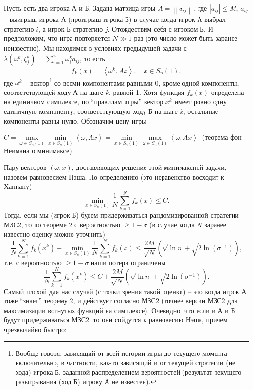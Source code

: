 \begin{problem}

Пусть есть два игрока А и Б. Задана матрица игры $A=\left\| {a_{ij} } \right\|$, где $\left| 
{a_{ij} } \right|\le M$, $a_{ij} $ -- выигрыш игрока А (проигрыш игрока Б) в 
случае когда игрок А выбрал стратегию $i$, а игрок Б стратегию $j$. 
Отождествим себя с игроком Б. И предположим, что игра повторяется $N\gg 1$ 
раз (это число может быть заранее неизвестно). Мы находимся в условиях 
предыдущей задачи с $\lambda \left( {\omega ^k,\zeta _j^k } 
\right)=\sum\limits_{i=1}^n {\omega _i^k a_{ij} } $, то есть
\[
f_k \left( x \right)=\left\langle {\omega ^k,Ax} \right\rangle ,
\quad
x\in S_n \left( 1 \right),
\]
где $\omega ^k$ -- вектор\footnote{ Вообще говоря, зависящий от всей истории 
игры до текущего момента включительно, в частности, как-то зависящий и от 
текущей стратегии (не хода) игрока Б, заданной распределением вероятностей 
(результат текущего разыгрывания (ход Б) игроку А не известен).} со всеми 
компонентами равными 0, кроме одной компоненты, соответствующей ходу А на 
шаге $k$, равной 1. Хотя функция $f_k \left( x \right)$ определена на 
единичном симплексе, по ``правилам игры'' вектор $x^k$ имеет ровно одну 
единичную компоненту, соответствующую ходу Б на шаге $k$, остальные 
компоненты равны нулю. Обозначим цену игры

$C=\mathop {\max }\limits_{\omega \in S_n \left( 1 \right)} \mathop {\min 
}\limits_{x\in S_n \left( 1 \right)} \left\langle {\omega ,Ax} \right\rangle 
=\mathop {\min }\limits_{x\in S_n \left( 1 \right)} \mathop {\max 
}\limits_{\omega \in S_n \left( 1 \right)} \left\langle {\omega ,Ax} 
\right\rangle .$ (теорема фон Неймана о минимаксе)

Пару векторов $\left( {\omega ,x} \right)$, доставляющих решение этой 
минимаксной задачи, назовем равновесием Нэша. По определению (это 
неравенство восходит к Ханнану)
\[
\mathop {\min }\limits_{x\in S_n \left( 1 \right)} 
\frac{1}{N}\sum\limits_{k=1}^N {f_k \left( x \right)} \le C.
\]
Тогда, если мы (игрок Б) будем придерживаться рандомизированной стратегии 
МЗС2, то по теореме 2 с вероятностью $\ge 1-\sigma $ (в случае когда $N$ 
заранее известно оценку можно уточнить)
\[
\frac{1}{N}\sum\limits_{k=1}^N {f_k \left( {x^k} \right)} -\mathop {\min 
}\limits_{x\in S_n \left( 1 \right)} \frac{1}{N}\sum\limits_{k=1}^N {f_k 
\left( x \right)} \le \frac{2M}{\sqrt N }\left( {\sqrt {\ln n} +\sqrt {2\ln 
\left( {\sigma ^{-1}} \right)} } \right),
\]
т.е. с вероятностью $\ge 1-\sigma $ наши потери ограничены
\[
\frac{1}{N}\sum\limits_{k=1}^N {f_k \left( {x^k} \right)} \le 
C+\frac{2M}{\sqrt N }\left( {\sqrt {\ln n} +\sqrt {2\ln \left( {\sigma 
^{-1}} \right)} } \right).
\]
Самый плохой для нас случай (с точки зрения такой оценки) -- это когда игрок 
А тоже ``знает'' теорему 2, и действует согласно МЗС2 (точнее версии МЗС2 
для максимизации вогнутых функций на симплексе). Очевидно, что если и А и Б 
будут придерживаться МЗС2, то они сойдутся к равновесию Нэша, причем 
чрезвычайно быстро:


\end{problem}
